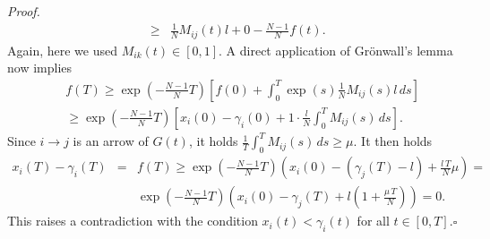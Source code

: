 \documentclass[journal]{article}
\newenvironment{proof}{{\it Proof.}~~}{\hfill$\square$}
\newcommand{\blu}[1]{{\textcolor{blue}{#1}}}
\begin{document}
\begin{proof}
\begin{eqnarray}
&\geq& \frac1N M_{ij}(t)l +0- \frac{N-1}N f(t).
\label{e-stimaf2}
\end{eqnarray}
Again, here we used $M_{ik}(t)\in [0,1]$. A direct application of  Gr\"onwall's lemma now implies 
\begin{eqnarray*}
&&f(T)\geq \exp(-\tfrac{N-1}{N}T)\left[ f(0)+\int_0^T\exp(s)\frac1N M_{ij}(s) l\,ds\right]\\
&&\geq \exp(-\tfrac{N-1}{N}T) \left[x_i(0)-\gamma_i(0)+1\cdot \frac l N  \int_0^T
M_{ij}(s)\,ds\right].
\end{eqnarray*}
Since $i\to j$ is an arrow of $G(t)$, it holds $\frac1T \int_{0}^T M_{ij}(s)\,ds\geq \mu$. It then holds
\begin{eqnarray*}
x_i(T)-\gamma_i(T)&=&f(T)\geq \exp(-\tfrac{N-1}{N}T) \left(x_i(0)-\left(\gamma_j(T)-l\right)+ \frac{l\, T}N \mu\right)=\\
&&\exp(-\tfrac{N-1}{N}T) \left(x_i(0)-\gamma_j(T)+l\left(1+\frac{\mu\, T}N\right)\right)=0.
\end{eqnarray*}
This raises a contradiction with the condition $x_i(t)< \gamma_i(t)$ for all $t\in[0,T]$.\end{proof}
\end{document}
